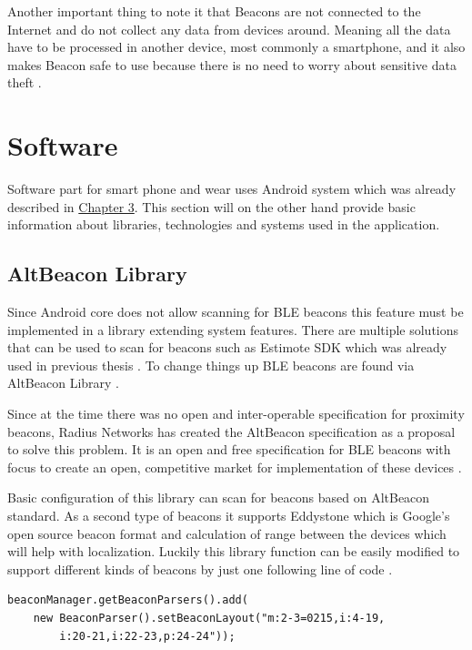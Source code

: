 Another important thing to note it that Beacons are not connected to the Internet and do not collect any data from devices around. Meaning all the data have to be processed in another device, most commonly a smartphone, and it also makes Beacon safe to use because there is no need to worry about sensitive data theft \cite{10TABB}.

\section{Software}\label{sec:Software}
Software part for smart phone and wear uses Android system which was already described in \hyperref[sec:Android]{Chapter 3}. This section will on the other hand provide basic information about libraries, technologies and systems used in the application.

\subsection{AltBeacon Library}\label{subsec:AltBeaconLibrary}
Since Android core does not allow scanning for BLE beacons this feature must be implemented in a library extending system features. There are multiple solutions that can be used to scan for beacons such as Estimote SDK \cite{ESDKfA} which was already used in previous thesis \cite{PMRIL}. To change things up BLE beacons are found via AltBeacon Library \cite{ABL}.

Since at the time there was no open and inter-operable specification for proximity beacons, Radius Networks has created the AltBeacon specification as a proposal to solve this problem. It is an open and free specification for BLE beacons with focus to create an open, competitive market for implementation of these devices \cite{AltB}.

Basic configuration of this library can scan for beacons based on AltBeacon standard. As a second type of beacons it supports Eddystone which is Google's open source beacon format and calculation of range between the devices which will help with localization. Luckily this library function can be easily modified to support different kinds of beacons by just one following line of code \cite{ABL, EDDF}.

\begin{lstlisting}[caption=Enable all beacons]
beaconManager.getBeaconParsers().add(
	new BeaconParser().setBeaconLayout("m:2-3=0215,i:4-19,
		i:20-21,i:22-23,p:24-24"));
\end{lstlisting}

